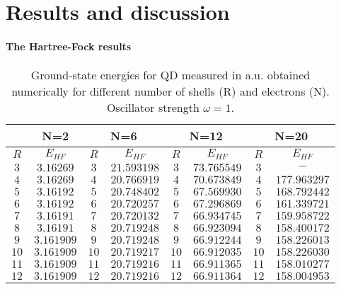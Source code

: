 \documentclass[twoside,english]{uiofysmaster}
\theoremstyle{definition}
\begin{document}
\chapter{Results and discussion}
\subsubsection{The Hartree-Fock results}
\begin{table}[h!]
	\begin{center}
		\begin{tabular}{|c c| c c| c c| c c|}
			\hline
			\multirow{2}{*}{} & 
			\multicolumn{1}{c}{N=2} \vline& 
			\multicolumn{2}{c}{N=6} \vline&
			\multicolumn{2}{c}{N=12} \vline&
			\multicolumn{2}{c}{N=20} \vline\\
			\hline
			$R$  & $E_{HF}$ & $R$ & $E_{HF}$ & $R$  & $E_{HF}$ &$R$ &  $E_{HF}$  \\
			\hline
			$  3 $   & $3.16269$  &$ 3 $  & $21.593198$  &$  3 $   & $73.765549$   &$ 3$  & $-          $   \\
			$  4 $   & $3.16269$  &$ 4 $  & $20.766919$  &$  4 $   & $70.673849$   &$ 4$  & $177.963297 $   \\
			$  5 $   & $3.16192$  &$ 5 $  & $20.748402$  &$  5 $   & $67.569930$   &$ 5$  & $168.792442 $   \\
			$  6 $   & $3.16192$  &$ 6 $  & $20.720257$  &$  6 $   & $67.296869$   &$ 6$  & $161.339721 $   \\
			$  7 $   & $3.16191$  &$ 7 $  & $20.720132$  &$  7 $   & $66.934745$   &$ 7$  & $159.958722 $   \\
			$  8 $   & $3.16191$  &$ 8 $  & $20.719248$  &$  8 $   & $66.923094$   &$ 8$  & $158.400172 $   \\
			$  9 $   & $3.161909$ &$ 9 $  & $20.719248$  &$  9 $   & $66.912244$   &$ 9$  & $158.226013 $   \\
			$  10$   & $3.161909$ &$ 10$  & $20.719217$  &$  10$   & $66.912035$   &$ 10$ & $158.226030 $   \\
			$  11$   & $3.161909$ &$ 11$  & $20.719216$  &$  11$   & $66.911365$   &$ 11$ & $158.010277 $   \\
			$  12$   & $3.161909$ &$ 12$  & $20.719216$  &$  12$   & $66.911364$   &$ 12$ & $158.004953 $   \\
			\hline                                                                                    
		\end{tabular}
		\caption{ Ground-state energies for QD measured in a.u. obtained numerically for different number of shells (R) and electrons (N).  Oscillator strength $\omega=1$.}   \label{tab:resultsHF}
	\end{center}
\end{table}
\end{document}
